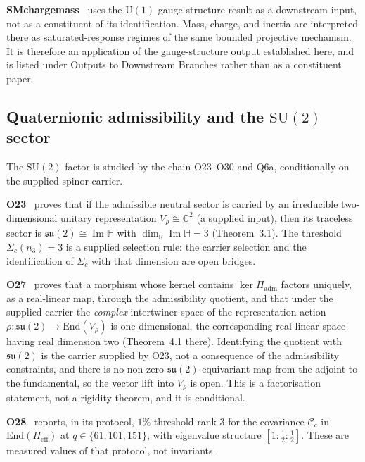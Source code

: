 \documentclass[11pt,a4paper]{article}
\theoremstyle{definition}
\newcommand{\SU}{\mathrm{SU}}
\newcommand{\su}{\mathfrak{su}}
\newcommand{\UU}{\mathrm{U}}
\newcommand{\ImH}{\operatorname{Im}\mathbb{H}}
\begin{document}
      \textbf{SMchargemass}~\cite{Beau2026e} uses the $\UU(1)$ gauge-structure result as a
      downstream input, not as a constituent of its identification.
      Mass, charge, and inertia are interpreted there as saturated-response regimes of the
      same bounded projective mechanism.
      It is therefore an application of the gauge-structure output established here, and is
      listed under Outputs to Downstream Branches rather than as a constituent paper.

    \subsection{Quaternionic admissibility and the \texorpdfstring{$\SU(2)$}{SU(2)} sector}
      \label{sec:su2}

      The $\SU(2)$ factor is studied by the chain O23--O30 and Q6a, conditionally on the
      supplied spinor carrier.

      \textbf{O23}~\cite{Beau2026a27} proves that if the admissible neutral sector is carried
      by an irreducible two-dimensional unitary representation $V_\rho \cong \mathbb{C}^2$ (a
      supplied input), then its traceless sector is $\su(2) \cong \ImH$ with
      $\dim_\mathbb{R} \ImH = 3$ (Theorem~3.1).
      The threshold $\Sigma_c(n_3) = 3$ is a supplied selection rule: the carrier selection
      and the identification of $\Sigma_c$ with that dimension are open bridges.

      \textbf{O27}~\cite{Beau2026a31} proves that a morphism whose kernel contains
      $\ker \Pi_{\mathrm{adm}}$ factors uniquely, as a real-linear map, through the admissibility
      quotient, and that under the supplied carrier the \emph{complex} intertwiner space of the
      representation action $\rho \colon \su(2) \to \mathrm{End}(V_\rho)$ is one-dimensional, the
      corresponding real-linear space having real dimension two (Theorem~4.1 there).
      Identifying the quotient with $\su(2)$ is the carrier supplied by O23, not a consequence of
      the admissibility constraints, and there is no non-zero $\su(2)$-equivariant map from the
      adjoint to the fundamental, so the vector lift into $V_\rho$ is open.
      This is a factorisation statement, not a rigidity theorem, and it is conditional.

      \textbf{O28}~\cite{Beau2026a32} reports, in its protocol, $1\%$ threshold rank 3 for the
      covariance $\mathcal{C}_c$ in $\mathrm{End}(H_{\mathrm{eff}})$ at $q \in \{61, 101, 151\}$, with
      eigenvalue structure $[1 : \tfrac{1}{2} : \tfrac{1}{2}]$.
      These are measured values of that protocol, not invariants.
\end{document}
